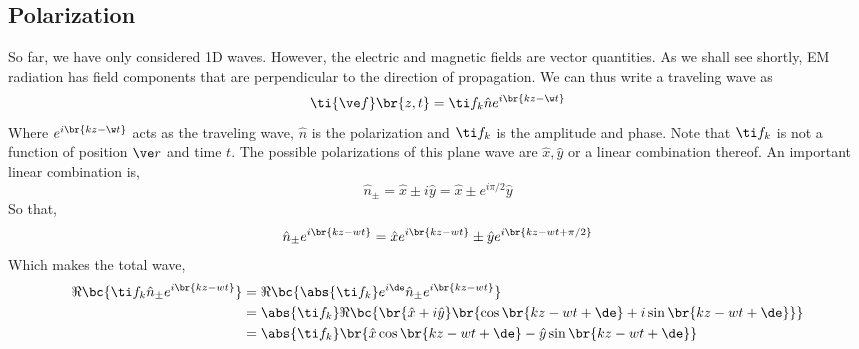 \documentclass{article}
\begin{document}
\subsection{Polarization}
So far, we have only considered 1D waves. However, the electric and magnetic fields are vector quantities. As we shall see shortly, EM radiation has field components that are perpendicular to the direction of propagation. We can thus write a traveling wave as
\[ \ti {\ve f}\br{z, t} = \ti f_{k} \hat n e^{i\br{kz - \w t}} \]
Where $e^{i\br{kz - \w t}}$ acts as the traveling wave, $\hat n$ is the polarization and $\ti f_{k}$ is the amplitude and phase. Note that $\ti f_{k}$ is not a function of position $\ve r$ and time $t$. The possible polarizations of this plane wave are $\hat x, \hat y$ or a linear combination thereof. An important linear combination is,
\[ \hat n_{\pm} = \hat x \pm i \hat y = \hat x \pm e^{i \pi / 2} \hat y \]
So that,
\[ \hat n_{\pm} e^{i\br{kz - wt}} = \hat x e^{i\br{kz - wt}} \pm \hat y e^{i\br{kz - wt + \pi/2}}\]
Which makes the total wave,
\begin{align*}
\Re\bc{\ti f_{k}\hat n_{\pm} e^{i\br{kz - wt}}}
&= \Re\bc{\abs{\ti f_{k}} e^{i \de} \hat n_{\pm} e^{i\br{kz - wt}}} \\
&= \abs{\ti f_{k}}\Re\bc{\br{\hat x + i \hat y} \br{\cos \br{kz - wt + \de} + i\sin \br{kz - wt + \de}}} \\
&= \abs{\ti f_{k}}\br{\hat x \cos \br{kz - wt + \de} - \hat y\sin \br{kz - wt + \de}} \\
\end{align*}

\begin{center}
\end{center}
\end{document}
